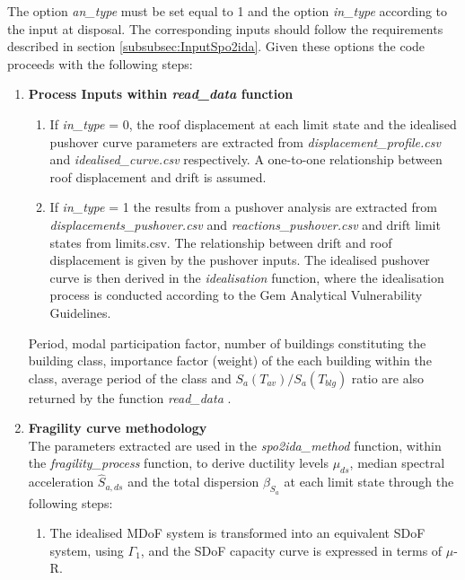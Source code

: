 The option \textit{an\_type} must be set equal to 1 and the option \textit{in\_type} according to the input at disposal. The corresponding inputs should follow the requirements described in section \ref{subsubsec:InputSpo2ida}. Given these options the code proceeds with the following steps:\\

\begin{enumerate}
\item \textbf{Process Inputs within \textit{read\_data}  function}\\
\begin{enumerate}
\item If \textit{in\_type} = 0, the roof displacement at each limit state and the idealised pushover curve parameters are extracted from \textit{displacement\_profile.csv} and \textit{idealised\_curve.csv} respectively. A one-to-one relationship between roof displacement and drift is assumed.

\item If \textit{in\_type} = 1 the results from a pushover analysis are extracted from \textit{displacements\_pushover.csv} and \textit{reactions\_pushover.csv} and drift limit states from {limits.csv}. The relationship between drift and roof displacement is given by the pushover inputs. The idealised pushover curve is then derived in the \textit{idealisation} function, where the idealisation process is conducted according to the Gem Analytical Vulnerability Guidelines.\\	\end{enumerate}

Period, modal participation factor, number of buildings constituting the building class, importance factor (weight) of the each building within the class, average period of the class and $S_a(T_{av})/S_a(T_{blg})$ ratio are also returned by the function \textit{read\_data} .\\

\item \textbf{Fragility curve methodology}\\
The parameters extracted are used in the \textit{spo2ida\_method} function, within the \textit{fragility\_process} function, to derive ductility levels $\mu_{ds}$, median spectral acceleration $\hat{S}_{a,ds}$ and the total dispersion $\beta_{S_a}$ at each limit state through the following steps:

\begin{enumerate}

\item The idealised MDoF system is transformed into an equivalent SDoF system, using $\Gamma_1$, and the SDoF capacity curve is  expressed in terms of $\mu$-R.


\end{enumerate}
\end{enumerate}
